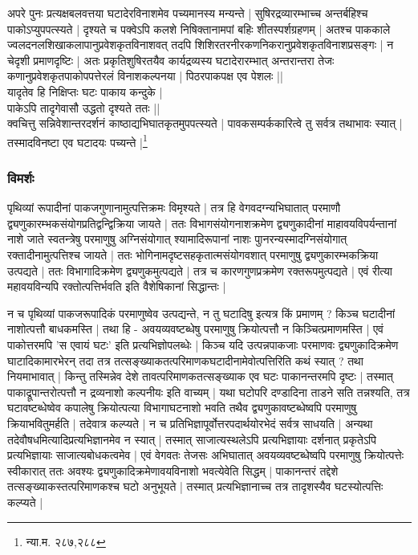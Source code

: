 {\fontsize{11.7}{0}\selectfont\s अपरे पुनः प्रत्यक्षबलवत्तया घटादेरविनाशमेव पच्यमानस्य मन्यन्ते | सुषिरद्रव्यारम्भाच्च अन्तर्बहिश्च पाकोऽप्युपपत्स्यते | दृश्यते च पक्वेऽपि कलशे निषिक्तानामपां बहिः शीतस्पर्शग्रहणम् | अतश्च पाककाले ज्वलदनलशिखाकलापानुप्रवेशकृतविनाशवत् तदपि शिशिरतरनीरकणनिकरानुप्रवेशकृतविनाशप्रसङ्गः | न चेदृशी प्रमाणदृष्टिः | अतः प्रकृतिशुषिरतयैव कार्यद्रव्यस्य घटादेरारम्भात् अन्तरान्तरा तेजः कणानुप्रवेशकृतपाकोपपत्तेरलं विनाशकल्पनया | पिठरपाकपक्ष एव पेशलः ||\\ यादृतेव हि निक्षिप्तः घटः पाकाय कन्दुके |\\ पाकेऽपि तादृगेवासौ उद्धतो दृश्यते ततः ||\\ 

क्वचित्तु सन्निवेशान्तरदर्शनं काष्ठाद्यभिघातकृतमुपपत्स्यते | पावकसम्पर्ककारित्वे तु सर्वत्र तथाभावः स्यात् | तस्मादविनष्टा एव घटादयः पच्यन्ते |\footnote{न्या.म. २८७,२८८}}

\subsubsection{विमर्शः}

पृथिव्यां रूपादीनां पाकजगुणानामुत्पत्तिक्रमः विमृश्यते | तत्र हि वेगवदग्न्यभिघातात् परमाणौ द्व्यणुकारम्भकसंयोगप्रतिद्वन्द्विक्रिया जायते | ततः विभागसंयोगनाशक्रमेण द्व्यणुकादीनां माहावयविपर्यन्तानां नाशे जाते स्वतन्त्रेषु परमाणुषु अग्निसंयोगात् श्यामादिरूपानां नाशः पाुनरन्यस्मादग्निसंयोगात् रक्तादीनामुत्पत्तिश्च जायते | ततः भोगिनामदृष्टसहकृतात्मसंयोगवशात् परमाणुषु द्व्यणुकारम्भकक्रिया उत्पद्यते | ततः विभागादिक्रमेण द्व्यणुकमुत्पद्यते | तत्र च कारणगुणप्रक्रमेण रक्तरूपमुत्पद्यते | एवं रीत्या महावयविन्यपि रक्तोत्पत्तिर्भवति इति वैशेषिकानां सिद्धान्तः |

न च पृथिव्यां पाकजरूपादिकं परमाणुष्वेव उत्पद्यन्ते, न तु घटादिषु इत्यत्र किं प्रमाणम् ? किञ्च घटादीनां नाशोत्पत्तौ बाधकमस्ति | तथा हि - अवयव्यवष्टब्धेषु परमाणुषु क्रियोत्पत्तौ न किञ्चित्प्रमाणमस्ति | एवं पाकोत्तरमपि 'स एवायं घटः' इति प्रत्यभिज्ञोपलब्धेः | किञ्च यदि उत्पन्नपाकजाः परमाणवः द्व्यणुकादिक्रमेण घाटादिकामारभेरन् तदा तत्र तत्सङ्ख्याकतत्परिमाणकघटादीनामेवोत्पत्तिरिति कथं स्यात् ? तथा नियमाभावात् | किन्तु तस्मिन्नेव देशे तावत्परिमाणकतत्सङ्ख्याक एव घटः पाकानन्तरमपि दृष्टः | तस्मात् पाकाद्रूपान्तरोत्पत्तौ न द्रव्यनाशो कल्पनीयः इति वाच्यम् | यथा घटोपरि दण्डादिना ताडने सति तन्नश्यति, तत्र घटावष्टब्धेष्वेव कपालेषु क्रियोत्पत्या विभागाघटनाशो भवति तथैव द्व्यणुकावष्टब्धेष्वपि परमाणुषु क्रियाभवितुमर्हति | तदेवात्र कल्प्यते | न च प्रतिभिज्ञापूर्वोत्तरपदार्थयोरभेदं सर्वत्र साधयति | अन्यथा तदेवौषधमित्यादिप्रत्यभिज्ञानमेव न स्यात् | तस्मात् साजात्यस्थलेऽपि प्रत्यभिज्ञायाः दर्शनात् प्रकृतेऽपि प्रत्यभिज्ञायाः साजात्यबोधकत्वमेव | एवं वेगवतः तेजसः अभिघातात् अवयव्यवष्टब्धेष्वपि परमाणुषु क्रियोत्पत्तेः स्वीकारात् ततः अवश्यः द्व्यणुकादिक्रमेणावयविनाशो भवत्येवेति सिद्धम् | पाकानन्तरं तद्देशे तत्सङ्ख्याकस्तत्परिमाणकश्च घटो अनुभूयते | तस्मात् प्रत्यभिज्ञानाच्च तत्र तादृशस्यैव घटस्योत्पत्तिः कल्प्यते |

